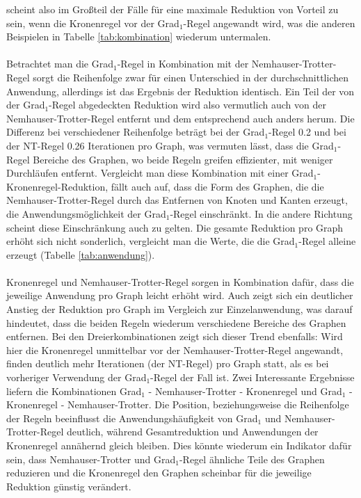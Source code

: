 scheint also im Großteil der Fälle für eine maximale Reduktion von Vorteil zu sein, wenn die Kronenregel vor der Grad$_{1}$-Regel angewandt wird, was die anderen Beispielen in Tabelle \ref{tab:kombination} wiederum untermalen.\\ \\
Betrachtet man die Grad$_{1}$-Regel in Kombination mit der Nemhauser-Trotter-Regel sorgt die Reihenfolge zwar für einen Unterschied in der durchschnittlichen Anwendung, allerdings ist das Ergebnis der Reduktion identisch. Ein Teil der von der Grad$_{1}$-Regel abgedeckten Reduktion wird also vermutlich auch von der Nemhauser-Trotter-Regel entfernt und dem entsprechend auch anders herum. Die Differenz bei verschiedener Reihenfolge beträgt bei der Grad$_{1}$-Regel 0.2 und bei der NT-Regel 0.26 Iterationen pro Graph, was vermuten lässt, dass die Grad$_{1}$-Regel Bereiche des Graphen, wo beide Regeln greifen effizienter, mit weniger Durchläufen entfernt. Vergleicht man diese Kombination mit einer Grad$_{1}$-Kronenregel-Reduktion, fällt auch auf, dass die Form des Graphen, die die Nemhauser-Trotter-Regel durch das Entfernen von Knoten und Kanten erzeugt, die Anwendungsmöglichkeit der Grad$_{1}$-Regel einschränkt. In die andere Richtung scheint diese Einschränkung auch zu gelten. Die gesamte Reduktion pro Graph erhöht sich nicht sonderlich, vergleicht man die Werte, die die Grad$_{1}$-Regel alleine erzeugt (Tabelle \ref{tab:anwendung}). \\ \\
Kronenregel und Nemhauser-Trotter-Regel sorgen in Kombination dafür, dass die jeweilige Anwendung pro Graph leicht erhöht wird. Auch zeigt sich ein deutlicher Anstieg der Reduktion pro Graph im Vergleich zur Einzelanwendung, was darauf hindeutet, dass die beiden Regeln wiederum verschiedene Bereiche des Graphen entfernen. Bei den Dreierkombinationen zeigt sich dieser Trend ebenfalls: Wird hier die Kronenregel unmittelbar vor der Nemhauser-Trotter-Regel angewandt, finden deutlich mehr Iterationen (der NT-Regel) pro Graph statt, als es bei vorheriger Verwendung der Grad$_{1}$-Regel der Fall ist. Zwei Interessante Ergebnisse liefern die Kombinationen Grad$_{1}$ - Nemhauser-Trotter - Kronenregel und Grad$_{1}$ - Kronenregel - Nemhauser-Trotter. Die Position, beziehungsweise die Reihenfolge der Regeln beeinflusst die Anwendungshäufigkeit von Grad$_{1}$ und Nemhauser-Trotter-Regel deutlich, während Gesamtreduktion und Anwendungen der Kronenregel annähernd gleich bleiben. Dies könnte wiederum ein Indikator dafür sein, dass Nemhauser-Trotter und Grad$_{1}$-Regel ähnliche Teile des Graphen reduzieren und die Kronenregel den Graphen scheinbar für die jeweilige Reduktion günstig verändert.
